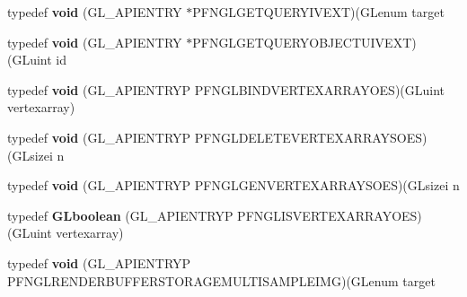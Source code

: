 \begin{DoxyCompactItemize}
\item 
\hypertarget{class_c_p_v_r_tgles2_ext_a843b44485280f8d8e38dc58bd99be3d2}{typedef {\bfseries void} (G\+L\+\_\+\+A\+P\+I\+E\+N\+T\+R\+Y $\ast$P\+F\+N\+G\+L\+G\+E\+T\+Q\+U\+E\+R\+Y\+I\+V\+E\+X\+T)(G\+Lenum target}\label{class_c_p_v_r_tgles2_ext_a843b44485280f8d8e38dc58bd99be3d2}

\item 
\hypertarget{class_c_p_v_r_tgles2_ext_a7fe2e1fbb476b648e28f5a5efb1a9e61}{typedef {\bfseries void} (G\+L\+\_\+\+A\+P\+I\+E\+N\+T\+R\+Y $\ast$P\+F\+N\+G\+L\+G\+E\+T\+Q\+U\+E\+R\+Y\+O\+B\+J\+E\+C\+T\+U\+I\+V\+E\+X\+T)(G\+Luint id}\label{class_c_p_v_r_tgles2_ext_a7fe2e1fbb476b648e28f5a5efb1a9e61}

\item 
\hypertarget{class_c_p_v_r_tgles2_ext_a502025e8206f97690ccabccfdd4a01bb}{typedef {\bfseries void} (G\+L\+\_\+\+A\+P\+I\+E\+N\+T\+R\+Y\+P P\+F\+N\+G\+L\+B\+I\+N\+D\+V\+E\+R\+T\+E\+X\+A\+R\+R\+A\+Y\+O\+E\+S)(G\+Luint vertexarray)}\label{class_c_p_v_r_tgles2_ext_a502025e8206f97690ccabccfdd4a01bb}

\item 
\hypertarget{class_c_p_v_r_tgles2_ext_aa2e84273efaec2c0c7c5f0ffe0f5c20b}{typedef {\bfseries void} (G\+L\+\_\+\+A\+P\+I\+E\+N\+T\+R\+Y\+P P\+F\+N\+G\+L\+D\+E\+L\+E\+T\+E\+V\+E\+R\+T\+E\+X\+A\+R\+R\+A\+Y\+S\+O\+E\+S)(G\+Lsizei n}\label{class_c_p_v_r_tgles2_ext_aa2e84273efaec2c0c7c5f0ffe0f5c20b}

\item 
\hypertarget{class_c_p_v_r_tgles2_ext_ac84ea4716600cb4d3ef23c08839a7b90}{typedef {\bfseries void} (G\+L\+\_\+\+A\+P\+I\+E\+N\+T\+R\+Y\+P P\+F\+N\+G\+L\+G\+E\+N\+V\+E\+R\+T\+E\+X\+A\+R\+R\+A\+Y\+S\+O\+E\+S)(G\+Lsizei n}\label{class_c_p_v_r_tgles2_ext_ac84ea4716600cb4d3ef23c08839a7b90}

\item 
\hypertarget{class_c_p_v_r_tgles2_ext_a8b49619404ed7328eb0b27ec14ac11a0}{typedef {\bfseries G\+Lboolean} (G\+L\+\_\+\+A\+P\+I\+E\+N\+T\+R\+Y\+P P\+F\+N\+G\+L\+I\+S\+V\+E\+R\+T\+E\+X\+A\+R\+R\+A\+Y\+O\+E\+S)(G\+Luint vertexarray)}\label{class_c_p_v_r_tgles2_ext_a8b49619404ed7328eb0b27ec14ac11a0}

\item 
\hypertarget{class_c_p_v_r_tgles2_ext_aae4d9e793a85b863ae05aa4925818b46}{typedef {\bfseries void} (G\+L\+\_\+\+A\+P\+I\+E\+N\+T\+R\+Y\+P P\+F\+N\+G\+L\+R\+E\+N\+D\+E\+R\+B\+U\+F\+F\+E\+R\+S\+T\+O\+R\+A\+G\+E\+M\+U\+L\+T\+I\+S\+A\+M\+P\+L\+E\+I\+M\+G)(G\+Lenum target}\label{class_c_p_v_r_tgles2_ext_aae4d9e793a85b863ae05aa4925818b46}


\end{DoxyCompactItemize}
